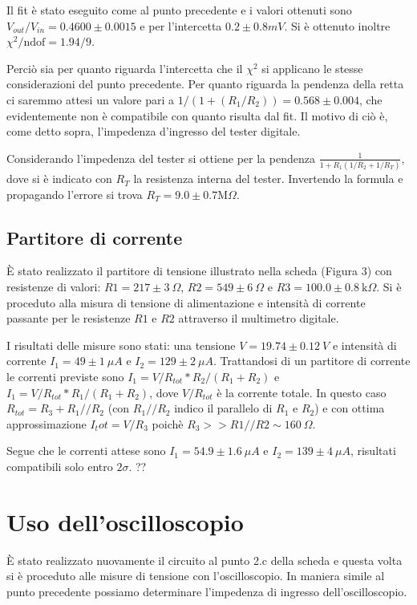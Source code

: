 \documentclass[10pt,a4paper]{article}
\begin{document}
Il fit è stato eseguito come al punto precedente e i valori ottenuti sono $V_{out}/V_{in} = 0.4600 \pm 0.0015$ e per l'intercetta $0.2 \pm 0.8 mV$. Si è ottenuto inoltre $\chi^2 / \text{ndof} = 1.94 / 9$.

Perciò sia per quanto riguarda l'intercetta che il $\chi^2$ si applicano le stesse considerazioni del punto precedente. Per quanto riguarda la pendenza della retta ci saremmo attesi un valore pari a  $1/(1+(R_1/R_2))=0.568 \pm 0.004$, che evidentemente non è compatibile con quanto risulta dal fit. Il motivo di ciò è, come detto sopra, l'impedenza d'ingresso del tester digitale.

Considerando l'impedenza del tester si ottiene per la pendenza $\frac{1}{1 + R_1 (1/R_2 + 1/R_T)}$, dove si è indicato con $R_T$ la resistenza interna del tester. Invertendo la formula e propagando l'errore si trova $R_T = 9.0 \pm 0.7 \text{M}\Omega$.

\subsection{Partitore di corrente}
È stato realizzato il partitore di tensione illustrato nella scheda (Figura 3) con resistenze di valori: $R1=217 \pm 3 ~\Omega$, $R2=549 \pm 6 ~ \Omega$ e $R3=100.0 \pm 0.8 ~\text{k}\Omega$. Si è proceduto alla misura di tensione di alimentazione e intensità di corrente passante per le resistenze $R1$ e $R2$ attraverso il multimetro digitale.

I risultati delle misure sono stati: una tensione $V = 19.74 \pm 0.12~ V$ e intensità di corrente $I_1=49 \pm 1 ~\mu A$ e $I_2 = 129 \pm 2 ~ \mu A$. Trattandosi di un partitore di corrente le correnti previste sono $I_1 = V/R_{tot}*R_2/(R_1+R_2)$ e $I_1 = V/R_{tot}*R_1/(R_1+R_2)$, dove $V/R_{tot}$ è la corrente totale. In questo caso $R_{tot} = R_3 + R_1//R_2$ (con $R_1//R_2$ indico il parallelo di $R_1$ e $R_2$) e con ottima approssimazione $I_tot=V/R_3$ poichè $R_3 >> R1//R2 \sim 160 ~\Omega$.

Segue che le correnti attese sono $I_1 = 54.9 \pm 1.6 ~\mu A$ e $I_2 = 139 \pm 4~ \mu A$, risultati compatibili solo entro $2 \sigma$. ??


\section{Uso dell'oscilloscopio}
È stato realizzato nuovamente il circuito al punto 2.c della scheda e questa volta si è proceduto alle misure di tensione con l'oscilloscopio. In maniera simile al punto precedente possiamo determinare l'impedenza di ingresso dell'oscilloscopio.
\end{document}
